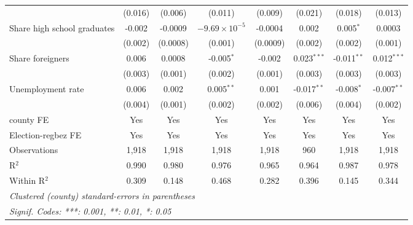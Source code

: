 \begin{table}[htbp]
\begin{tabular}{lccccccc}
                                                              & (0.016)        & (0.006)        & (0.011)                & (0.009)        & (0.021)        & (0.018)        & (0.013)\\   
      Share high school graduates                             & -0.002         & -0.0009        & $-9.69\times 10^{-5}$  & -0.0004        & 0.002          & 0.005$^{*}$    & 0.0003\\   
                                                              & (0.002)        & (0.0008)       & (0.001)                & (0.0009)       & (0.002)        & (0.002)        & (0.001)\\   
      Share foreigners                                        & 0.006          & 0.0008         & -0.005$^{*}$           & -0.002         & 0.023$^{***}$  & -0.011$^{**}$  & 0.012$^{***}$\\   
                                                              & (0.003)        & (0.001)        & (0.002)                & (0.001)        & (0.003)        & (0.003)        & (0.003)\\   
      Unemployment rate                                       & 0.006          & 0.002          & 0.005$^{**}$           & 0.001          & -0.017$^{**}$  & -0.008$^{*}$   & -0.007$^{**}$\\   
                                                              & (0.004)        & (0.001)        & (0.002)                & (0.002)        & (0.006)        & (0.004)        & (0.002)\\   
      county FE                                               & Yes            & Yes            & Yes                    & Yes            & Yes            & Yes            & Yes\\  
      Election-regbez FE                                      & Yes            & Yes            & Yes                    & Yes            & Yes            & Yes            & Yes\\  
      Observations                                            & 1,918          & 1,918          & 1,918                  & 1,918          & 960            & 1,918          & 1,918\\  
      R$^2$                                                   & 0.990          & 0.980          & 0.976                  & 0.965          & 0.964          & 0.987          & 0.978\\  
      Within R$^2$                                            & 0.309          & 0.148          & 0.468                  & 0.282          & 0.396          & 0.145          & 0.344\\  
      \midrule \midrule
      \multicolumn{8}{l}{\emph{Clustered (county) standard-errors in parentheses}}\\
      \multicolumn{8}{l}{\emph{Signif. Codes: ***: 0.001, **: 0.01, *: 0.05}}\\
   \end{tabular}
\end{table}



